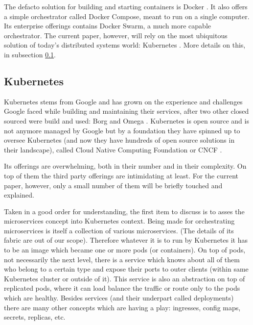 \documentclass[conference]{IEEEtran}
\begin{document}
    The defacto solution for building and starting containers is Docker \cite{b8}. It also offers a simple orchestrator called Docker Compose, meant to run on a single computer. Its enterprise offerings contains Docker Swarm, a much more capable orchestrator. The current paper, however, will rely on the most ubiquitous solution of today's distributed systems world: Kubernetes \cite{b9}. More details on this, in subsection \ref{subsec:kube}.

\subsection{Kubernetes}
\label{subsec:kube}

    Kubernetes stems from Google and has grown on the experience and challenges Google faced while building and maintaining their services, after two other closed sourced were build and used: Borg and Omega \cite{b9}. Kubernetes is open source and is not anymore managed by Google but by a foundation they have spinned up to oversee Kubernetes (and now they have hundreds of open source solutions in their landscape), called Cloud Native Computing Foundation or CNCF \cite{b11}.

    Its offerings are overwhelming, both in their number and in their complexity. On top of them the third party offerings are intimidating at least. For the current paper, however, only a small number of them will be briefly touched and explained.

    Taken in a good order for understanding, the first item to discuss is to asses the microservices concept into Kubernetes context. Being made for orchestrating microservices is itself a collection of various microservices. (The details of its fabric are out of our scope). Therefore whatever it is to run by Kubernetes it has to be an image which became one or more pods (or containers). On top of pods, not necessarily the next level, there is a service which knows about all of them who belong to a certain type and expose their ports to outer clients (within same Kubernetes cluster or outside of it). This service is also an abstraction on top of replicated pods, where it can load balance the traffic or route only to the pods which are healthy. Besides services (and their underpart called deployments) there are many other concepts which are having a play: ingresses, config maps, secrets, replicas, etc.
\end{document}
